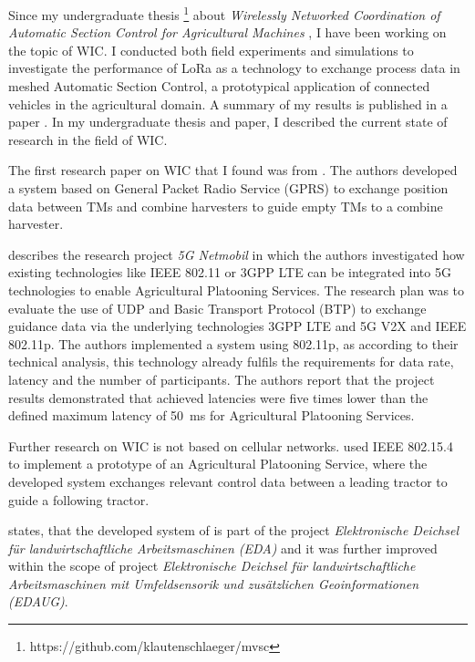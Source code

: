 Since my undergraduate thesis \footnote{https://github.com/klautenschlaeger/mvsc} about \textit{
Wirelessly Networked Coordination of Automatic Section Control for Agricultural Machines}
, I have been working on the topic of \ac{WIC}. I conducted both field experiments and
simulations to investigate the performance of LoRa as a technology to exchange process data in
meshed Automatic Section Control, a prototypical application of connected vehicles in the agricultural domain.
A summary of my results is published in a paper \cite{lautenschlaeger_beyond_2022}.
In my undergraduate thesis and paper, I described the current state of research in the field of WIC.

The first research paper on WIC that I found was from \textcite{ali_multi-agent_2010}. The authors
developed a system based on General Packet Radio Service (GPRS) to exchange position data between \ac{TM}s and combine
harvesters to guide empty \ac{TM}s to a combine harvester.

\textcite{smolnik_5g_2020} describes the research project \textit{5G Netmobil} in which the authors investigated how existing technologies like
IEEE 802.11 or 3GPP LTE can be integrated into 5G technologies to enable Agricultural Platooning Services. The research plan was to evaluate the use of \ac{UDP} and Basic Transport Protocol (BTP) to exchange guidance data via
the underlying technologies 3GPP LTE and 5G V2X and IEEE 802.11p. The authors implemented a system using 802.11p,
as according to their technical analysis, this technology already fulfils the requirements for data rate, latency
and the number of participants. The authors report that the project results demonstrated that achieved
latencies were five times lower than the defined maximum latency of \SI{50}{\milli\second} for Agricultural Platooning Services.

Further research on \ac{WIC} is not based on cellular networks. \textcite{zhang_method_2009} used IEEE 802.15.4 to implement a
prototype of an Agricultural Platooning Service, where the developed system exchanges relevant control data between a leading tractor
to guide a following tractor.

\textcite{smolnik_5g_2020} states, that the developed system of \textcite{zhang_method_2009} is part
of the project \textit{Elektronische Deichsel für landwirtschaftliche Arbeitsmaschinen (EDA)}
and it was further improved within the scope of project \textit{Elektronische Deichsel für landwirtschaftliche Arbeitsmaschinen mit Umfeldsensorik und zusätzlichen Geoinformationen (EDAUG)}.



